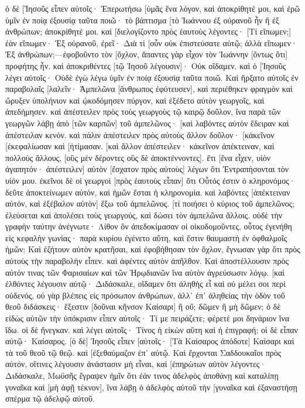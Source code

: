 ὁ δὲ [Ἰησοῦς εἶπεν αὐτοῖς· Ἐπερωτήσω [ὑμᾶς ἕνα λόγον, καὶ ἀποκρίθητέ μοι, καὶ ἐρῶ ὑμῖν ἐν ποίᾳ ἐξουσίᾳ ταῦτα ποιῶ· 
τὸ βάπτισμα [τὸ Ἰωάννου ἐξ οὐρανοῦ ἦν ἢ ἐξ ἀνθρώπων; ἀποκρίθητέ μοι. 
καὶ [διελογίζοντο πρὸς ἑαυτοὺς λέγοντες· [Τί εἴπωμεν;] ἐὰν εἴπωμεν· Ἐξ οὐρανοῦ, ἐρεῖ· Διὰ τί [οὖν οὐκ ἐπιστεύσατε αὐτῷ; 
ἀλλὰ εἴπωμεν· Ἐξ ἀνθρώπων;—ἐφοβοῦντο τὸν [ὄχλον, ἅπαντες γὰρ εἶχον τὸν Ἰωάννην [ὄντως ὅτι] προφήτης ἦν. 
καὶ ἀποκριθέντες [τῷ Ἰησοῦ λέγουσιν]· Οὐκ οἴδαμεν. καὶ ὁ [Ἰησοῦς λέγει αὐτοῖς· Οὐδὲ ἐγὼ λέγω ὑμῖν ἐν ποίᾳ ἐξουσίᾳ ταῦτα ποιῶ. 
Καὶ ἤρξατο αὐτοῖς ἐν παραβολαῖς [λαλεῖν· Ἀμπελῶνα [ἄνθρωπος ἐφύτευσεν], καὶ περιέθηκεν φραγμὸν καὶ ὤρυξεν ὑπολήνιον καὶ ᾠκοδόμησεν πύργον, καὶ ἐξέδετο αὐτὸν γεωργοῖς, καὶ ἀπεδήμησεν. 
καὶ ἀπέστειλεν πρὸς τοὺς γεωργοὺς τῷ καιρῷ δοῦλον, ἵνα παρὰ τῶν γεωργῶν λάβῃ ἀπὸ [τῶν καρπῶν] τοῦ ἀμπελῶνος· 
[καὶ λαβόντες αὐτὸν ἔδειραν καὶ ἀπέστειλαν κενόν. 
καὶ πάλιν ἀπέστειλεν πρὸς αὐτοὺς ἄλλον δοῦλον· [κἀκεῖνον [ἐκεφαλίωσαν καὶ [ἠτίμασαν. 
[καὶ ἄλλον ἀπέστειλεν· κἀκεῖνον ἀπέκτειναν, καὶ πολλοὺς ἄλλους, [οὓς μὲν δέροντες οὓς δὲ ἀποκτέννοντες]. 
ἔτι [ἕνα εἶχεν, υἱὸν ἀγαπητόν· ἀπέστειλεν] αὐτὸν [ἔσχατον πρὸς αὐτοὺς] λέγων ὅτι Ἐντραπήσονται τὸν υἱόν μου. 
ἐκεῖνοι δὲ οἱ γεωργοὶ [πρὸς ἑαυτοὺς εἶπαν] ὅτι Οὗτός ἐστιν ὁ κληρονόμος· δεῦτε ἀποκτείνωμεν αὐτόν, καὶ ἡμῶν ἔσται ἡ κληρονομία. 
καὶ λαβόντες [ἀπέκτειναν αὐτόν, καὶ ἐξέβαλον αὐτὸν] ἔξω τοῦ ἀμπελῶνος. 
[τί ποιήσει ὁ κύριος τοῦ ἀμπελῶνος; ἐλεύσεται καὶ ἀπολέσει τοὺς γεωργούς, καὶ δώσει τὸν ἀμπελῶνα ἄλλοις. 
οὐδὲ τὴν γραφὴν ταύτην ἀνέγνωτε· Λίθον ὃν ἀπεδοκίμασαν οἱ οἰκοδομοῦντες, οὗτος ἐγενήθη εἰς κεφαλὴν γωνίας· 
παρὰ κυρίου ἐγένετο αὕτη, καὶ ἔστιν θαυμαστὴ ἐν ὀφθαλμοῖς ἡμῶν; 
Καὶ ἐζήτουν αὐτὸν κρατῆσαι, καὶ ἐφοβήθησαν τὸν ὄχλον, ἔγνωσαν γὰρ ὅτι πρὸς αὐτοὺς τὴν παραβολὴν εἶπεν. καὶ ἀφέντες αὐτὸν ἀπῆλθον. 
Καὶ ἀποστέλλουσιν πρὸς αὐτόν τινας τῶν Φαρισαίων καὶ τῶν Ἡρῳδιανῶν ἵνα αὐτὸν ἀγρεύσωσιν λόγῳ. 
[καὶ ἐλθόντες λέγουσιν αὐτῷ· Διδάσκαλε, οἴδαμεν ὅτι ἀληθὴς εἶ καὶ οὐ μέλει σοι περὶ οὐδενός, οὐ γὰρ βλέπεις εἰς πρόσωπον ἀνθρώπων, ἀλλ᾽ ἐπ᾽ ἀληθείας τὴν ὁδὸν τοῦ θεοῦ διδάσκεις· ἔξεστιν [δοῦναι κῆνσον Καίσαρι] ἢ οὔ; δῶμεν ἢ μὴ δῶμεν; 
ὁ δὲ εἰδὼς αὐτῶν τὴν ὑπόκρισιν εἶπεν αὐτοῖς· Τί με πειράζετε; φέρετέ μοι δηνάριον ἵνα ἴδω. 
οἱ δὲ ἤνεγκαν. καὶ λέγει αὐτοῖς· Τίνος ἡ εἰκὼν αὕτη καὶ ἡ ἐπιγραφή; οἱ δὲ εἶπαν αὐτῷ· Καίσαρος. 
[ὁ δὲ] Ἰησοῦς εἶπεν [αὐτοῖς· [Τὰ Καίσαρος ἀπόδοτε] Καίσαρι καὶ τὰ τοῦ θεοῦ τῷ θεῷ. καὶ [ἐξεθαύμαζον ἐπ᾽ αὐτῷ. 
Καὶ ἔρχονται Σαδδουκαῖοι πρὸς αὐτόν, οἵτινες λέγουσιν ἀνάστασιν μὴ εἶναι, καὶ [ἐπηρώτων αὐτὸν λέγοντες· 
Διδάσκαλε, Μωϋσῆς ἔγραψεν ἡμῖν ὅτι ἐάν τινος ἀδελφὸς ἀποθάνῃ καὶ καταλίπῃ γυναῖκα καὶ [μὴ ἀφῇ τέκνον], ἵνα λάβῃ ὁ ἀδελφὸς αὐτοῦ τὴν [γυναῖκα καὶ ἐξαναστήσῃ σπέρμα τῷ ἀδελφῷ αὐτοῦ. 

